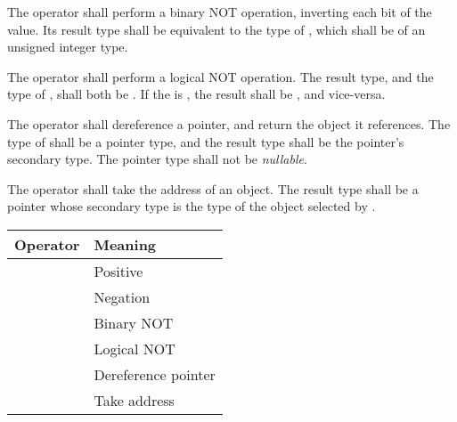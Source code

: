 \specsubsubitem
The \terminal{\textasciitilde} operator shall perform a binary NOT operation,
inverting each bit of the value. Its result type shall be equivalent to the
type of , which shall be of an unsigned integer
type.

\specsubsubitem
The \terminal{!} operator shall perform a logical NOT operation. The result
type, and the type of , shall both be
. If the  is , the
result shall be , and vice-versa.

\specsubsubitem
The \terminal{*} operator shall dereference a pointer, and return the object it
references.  The type of  shall be a pointer
type, and the result type shall be the pointer's secondary type. The pointer
type shall not be \textit{nullable}.

\specsubsubitem
The \terminal{\&} operator shall take the address of an object. The result type
shall be a pointer whose secondary type is the type of the object selected by
.


\begin{tabular}{r | l }
Operator & Meaning \\
\hline
\terminal{+} & Positive \\
\terminal{-} & Negation \\
\terminal{\textasciitilde} & Binary NOT \\
\terminal{!} & Logical NOT \\
\terminal{*} & Dereference pointer \\
\terminal{\&} & Take address \\
\end{tabular}


\begin{grammar}
 \\
	 \\
	 \terminal{:}  \\
	   \\
	   \\
\end{grammar}

